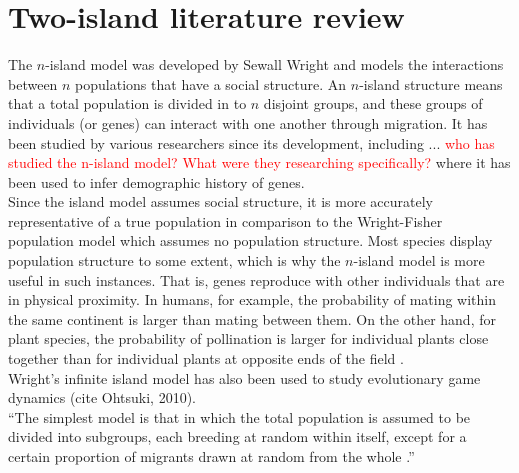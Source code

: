 \documentclass[12pt,a4paper]{article}
\begin{document}
\section{Two-island literature review}
The $n$-island model was developed by Sewall Wright \cite{slarkin1985gene} and models the interactions between $n$ populations that have a social structure. An $n$-island structure means that a total population is divided in to $n$ disjoint groups, and these groups of individuals (or genes) can interact with one another through migration. It has been studied by various researchers since its development, including ... \textcolor{red}{who has studied the n-island model? What were they researching specifically?} \cite{arredondo2021inferring} where it has been used to infer demographic history of genes. \\

Since the island model assumes social structure, it is more accurately representative of a true population in comparison to the Wright-Fisher population model which assumes no population structure. Most species display population structure to some extent, which is why the $n$-island model is more useful in such instances. That is, genes reproduce with other individuals that are in physical proximity. In humans, for example, the probability of mating within the same continent is larger than mating between them. On the other hand, for plant species, the probability of pollination is larger for individual plants close together than for individual plants at opposite ends of the field \cite{hein2004gene}. \\

Wright's infinite island model has also been used to study evolutionary game dynamics (cite Ohtsuki, 2010). \\

``The simplest model is that in which the total population is assumed to be divided into subgroups, each breeding at random within itself, except for a certain proportion of migrants drawn at random from the whole \citep{wright1943isolation}.''
\end{document}
